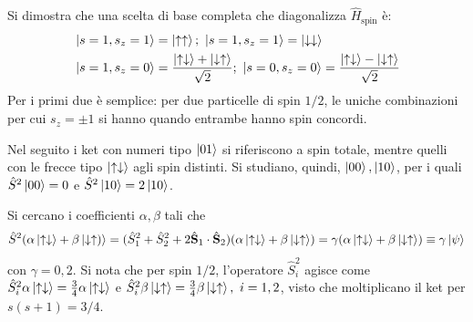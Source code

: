 \documentclass[11pt, a4paper]{scrartcl} %
\numberwithin{equation}{subsection}
\theoremstyle{style2}
\theoremstyle{style1}
\begin{document}
\begin{enumerate}[(1).]
Si dimostra che una scelta di base completa che diagonalizza $\hat{H}_\text{spin}$ \`e:
\begin{equation}
	\begin{split}
		&\ket{s=1,s_z =1} = \ket{\uparrow\uparrow} ; \ \ket{s=1, s_z=1}  = \ket{\downarrow\downarrow} \\
		&\ket{s=1,s_z = 0} = \frac{\ket{\uparrow\downarrow} + \ket{\downarrow\uparrow}  }{\sqrt{2} };\ \ket{s=0,s_z=0} = \frac{\ket{\uparrow\downarrow} - \ket{\downarrow\uparrow} }{\sqrt{2} } \\
	\end{split}
\end{equation}
Per i primi due \`e semplice: per due particelle di spin $1 / 2$, le uniche combinazioni per cui $s_z= \pm 1$ si hanno quando entrambe hanno spin concordi.

Nel seguito i ket con numeri tipo $\ket{01} $ si riferiscono a spin totale, mentre quelli con le frecce tipo $\ket{\uparrow\downarrow} $ agli spin distinti. 
Si studiano, quindi, $\ket{00} , \ket{10} $, per i quali $\hat{S}^2 \ket{00} = 0$ e $\hat{S}^2 \ket{10} = 2\ket{10} $.

Si cercano i coefficienti $\alpha ,\beta $ tali che
\[
\hat{S}^2(\alpha \ket{\uparrow \downarrow}  + \beta \ket{\downarrow\uparrow)} = (\hat{S}_1^2 + \hat{S}_2^2 + 2 \hat{\mathbf{S} }_1 \cdot \hat{\mathbf{S} }_2) (\alpha \ket{\uparrow \downarrow} + \beta \ket{\downarrow\uparrow} ) = \gamma(\alpha  \ket{\uparrow\downarrow} +\beta \ket{\downarrow\uparrow} )\equiv \gamma \ket{\psi } 
\] 
con $\gamma = 0 ,2$. Si nota che per spin $ 1 /2$, l'operatore $\hat{S}_i^2$ agisce come $\hat{S}_i^2 \alpha \ket{\uparrow\downarrow} = \frac{3}{4}\alpha  \ket{\uparrow\downarrow} $ e $\hat{S}_i^2 \beta \ket{\downarrow\uparrow} = \frac{3}{4} \beta \ket{\downarrow\uparrow} ,\  i = 1,2 $, visto che moltiplicano il ket per $s(s+1) = 3 / 4$.


\end{enumerate}
\end{document}
